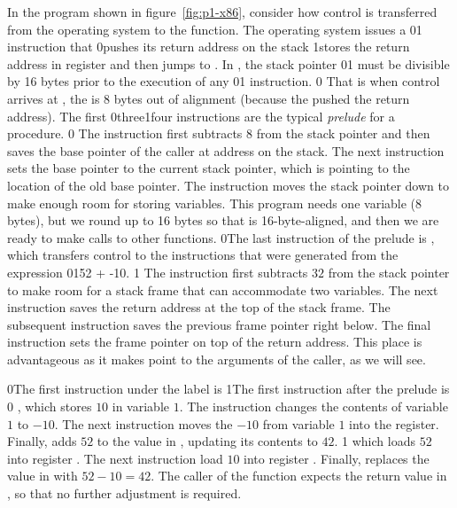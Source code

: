 \documentclass[7x10]{TimesAPriori_MIT}%
\def\racketEd{0}
\def\pythonEd{1}
\def\edition{1}
\def\xeightysixEd{0}
\def\riscvEd{1}
\def\architecture{1}
\newcommand\ifriscv[1]{\if\architecture\riscvEd{#1}\fi}
\newcommand\ifxeightsix[1]{\if\architecture\xeightysixEd{#1}\fi}
\newcommand{\racket}[1]{{\if\edition\racketEd{#1}\fi}}
\newcommand{\pythonColor}[0]{}
\newcommand{\python}[1]{{\if\edition\pythonEd\pythonColor #1\fi}}
\numberwithin{theorem}{chapter}
\numberwithin{definition}{chapter}
\numberwithin{equation}{chapter}
\begin{document}
In the program shown in figure~\ref{fig:p1-x86}, consider how control
is transferred from the operating system to the  function.
The operating system issues a \ifxeightsix{}\ifriscv{} instruction that
\ifxeightsix{pushes its return address on the stack}
\ifriscv{stores the return address in register } and then jumps to
. In {\ArchName}, the stack pointer \ifxeightsix{}\ifriscv{} must be divisible
by 16 bytes prior to the execution of any \ifxeightsix{}\ifriscv{} instruction.
\if\architecture\xeightysixEd
That is when control arrives at , the  is 8 bytes
out of alignment (because the  pushed the return address).
\fi
The first \ifxeightsix{three}\ifriscv{four} instructions are the typical
\emph{prelude} for a procedure.
\if\architecture\xeightysixEd
The instruction  first subtracts $8$ from the stack
pointer  and then saves the base pointer of the caller at
address  on the stack. The next instruction  sets the base pointer to the current stack pointer,
which is pointing to the location of the old base pointer. The
instruction  moves the stack pointer down to
make enough room for storing variables.
This program needs one
variable ($8$ bytes), but we round up to 16 bytes so that  is
16-byte-aligned, and then we are ready to make calls to other functions.
\racket{The last instruction of the prelude is , which
  transfers control to the instructions that were generated from the
  expression \racket{\code{(+ 52 (- 10))}}\python{52 + -10}.}
\fi
\if\architecture\riscvEd
The instruction  first subtracts $32$ from the stack
pointer  to make room for a stack frame that can
accommodate two variables. The next instruction 
saves the return address at the top of the stack frame. The subsequent
instruction  saves the previous frame pointer
right below. The final instruction 
 sets the frame pointer on top of the return
address. This place is advantageous as it makes  point to the
arguments of the caller, as we will see.
\fi

\racket{The first instruction under the  label is}
%
\python{The first instruction after the prelude is}
%
\if\architecture\xeightysixEd
{}, which stores $10$ in variable $1$.
%
The instruction  changes the contents of variable
$1$ to $-10$.
%
The next instruction moves the $-10$ from variable $1$ into the
 register.  Finally,  adds $52$ to
the value in , updating its contents to $42$.
\fi
\if\architecture\riscvEd
{} which loads $52$ into register .
The next instruction  load $10$ into register
.
Finally,  replaces the value in  with
$52-10=42$.
The caller of the function expects the return value in , so
that no further adjustment is required.
\fi
\end{document}
